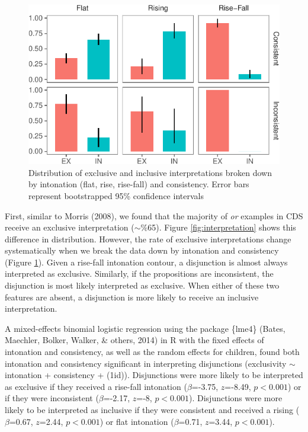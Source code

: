 \documentclass[10pt, letterpaper]{article}
\newenvironment{CodeChunk}{}{}
\begin{document}
\begin{CodeChunk}
\begin{figure}[t]

{\centering \includegraphics{figs/interpretationByIntonationAndConsistency-1} 

}

\caption[Distribution of exclusive and inclusive interpretations broken down by intonation (flat, rise, rise-fall) and consistency]{Distribution of exclusive and inclusive interpretations broken down by intonation (flat, rise, rise-fall) and consistency. Error bars represent bootstrapped 95\% confidence intervals}\label{fig:interpretationByIntonationAndConsistency}
\end{figure}
\end{CodeChunk}

First, similar to Morris (2008), we found that the majority of \emph{or}
examples in CDS receive an exclusive interpretation (\(\sim\)\%65).
Figure \ref{fig:interpretation} shows this difference in distribution.
However, the rate of exclusive interpretations change systematically
when we break the data down by intonation and consistency (Figure
\ref{fig:interpretationByIntonationAndConsistency}). Given a rise-fall
intonation contour, a disjunction is almost always interpreted as
exclusive. Similarly, if the propositions are inconsistent, the
disjunction is most likely interpreted as exclusive. When either of
these two features are absent, a disjunction is more likely to receive
an inclusive interpretation.

A mixed-effects binomial logistic regression using the package \{lme4\}
(Bates, Maechler, Bolker, Walker, \& others, 2014) in R with the fixed
effects of intonation and consistency, as well as the random effects for
children, found both intonation and consistency significant in
interpreting disjunctions (exclusivity \(\sim\) intonation + consistency
+ (1\textbar{}id)). Disjunctions were more likely to be interpreted as
exclusive if they received a rise-fall intonation (\(\beta\)=-3.75,
\(z\)=-8.49, \(p < 0.001\)) or if they were inconsistent
(\(\beta\)=-2.17, \(z\)=-8, \(p < 0.001\)). Disjunctions were more
likely to be interpreted as inclusive if they were consistent and
received a rising (\(\beta\)=0.67, \(z\)=2.44, \(p < 0.001\)) or flat
intonation (\(\beta\)=0.71, \(z\)=3.44, \(p < 0.001\)).
\end{document}
